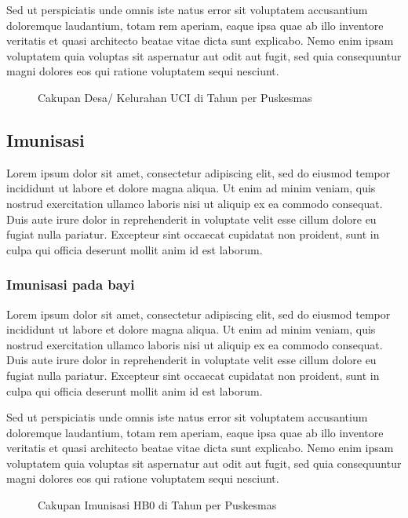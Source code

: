 Sed ut perspiciatis unde omnis iste natus error sit voluptatem accusantium doloremque laudantium, totam rem aperiam, eaque ipsa quae ab illo inventore veritatis et quasi architecto beatae vitae dicta sunt explicabo. Nemo enim ipsam voluptatem quia voluptas sit aspernatur aut odit aut fugit, sed quia consequuntur magni dolores eos qui ratione voluptatem sequi nesciunt.

\begin{figure}[H]
    \centering
    \caption{Cakupan Desa/ Kelurahan UCI di \namaKabupaten Tahun \tP per Puskesmas}
    \label{fig:Cakupan-Desa-UCI}
\end{figure}

\subsection{Imunisasi}
Lorem ipsum dolor sit amet, consectetur adipiscing elit, sed do eiusmod tempor incididunt ut labore et dolore magna aliqua. Ut enim ad minim veniam, quis nostrud exercitation ullamco laboris nisi ut aliquip ex ea commodo consequat. Duis aute irure dolor in reprehenderit in voluptate velit esse cillum dolore eu fugiat nulla pariatur. Excepteur sint occaecat cupidatat non proident, sunt in culpa qui officia deserunt mollit anim id est laborum.

\subsubsection{Imunisasi pada bayi}
Lorem ipsum dolor sit amet, consectetur adipiscing elit, sed do eiusmod tempor incididunt ut labore et dolore magna aliqua. Ut enim ad minim veniam, quis nostrud exercitation ullamco laboris nisi ut aliquip ex ea commodo consequat. Duis aute irure dolor in reprehenderit in voluptate velit esse cillum dolore eu fugiat nulla pariatur. Excepteur sint occaecat cupidatat non proident, sunt in culpa qui officia deserunt mollit anim id est laborum.

Sed ut perspiciatis unde omnis iste natus error sit voluptatem accusantium doloremque laudantium, totam rem aperiam, eaque ipsa quae ab illo inventore veritatis et quasi architecto beatae vitae dicta sunt explicabo. Nemo enim ipsam voluptatem quia voluptas sit aspernatur aut odit aut fugit, sed quia consequuntur magni dolores eos qui ratione voluptatem sequi nesciunt.

\begin{figure}[H]
    \centering
    \caption{Cakupan Imunisasi HB0 di \namaKabupaten Tahun \tP per Puskesmas}
    \label{fig:Cakupan-Imunisasi-HB0}
\end{figure}

